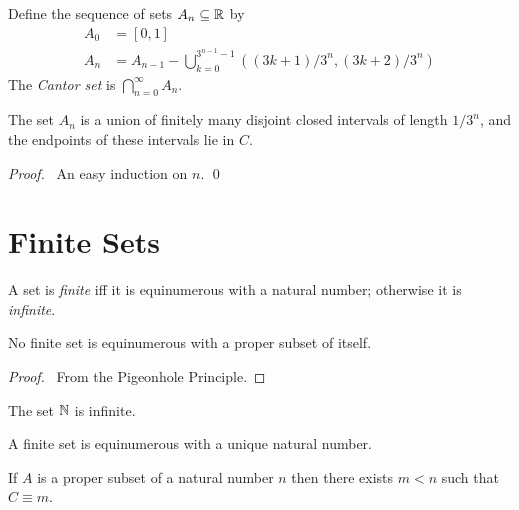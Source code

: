 \begin{definition}
    \label{definition:Cantor_set}
    Define the sequence of sets $A_n \subseteq \mathbb{R}$ by
    \begin{align*}
        A_0 & = [0,1] \\
        A_n & = A_{n-1} - \bigcup_{k=0}^{3^{n-1}-1} ((3k+1)/3^n, (3k+2)/3^n)
    \end{align*}
    The \emph{Cantor set} is $\bigcap_{n=0}^\infty A_n$.
\end{definition}

\begin{proposition}
    The set $A_n$ is a union of finitely many disjoint closed intervals
    of length $1 / 3^n$, and the endpoints of these intervals lie in $C$.
\end{proposition}

\begin{proof}
    \pf\ An easy induction on $n$. \qed
\end{proof}

\chapter{Finite Sets}

\begin{definition}[Finite]
    A set is \emph{finite} iff it is equinumerous with a natural number;
    otherwise it is \emph{infinite}.
\end{definition}

\begin{theorem}
    No finite set is equinumerous with a proper subset of itself.
\end{theorem}

\begin{proof}
    \pf\ From the Pigeonhole Principle.
\end{proof}

\begin{corollary}
    The set $\mathbb{N}$ is infinite.
\end{corollary}

\begin{corollary}
    A finite set is equinumerous with a unique natural number.
\end{corollary}

\begin{lemma}
    If $A$ is a proper subset of a natural number $n$ then there exists
    $m < n$ such that $C \equiv m$.
\end{lemma}

